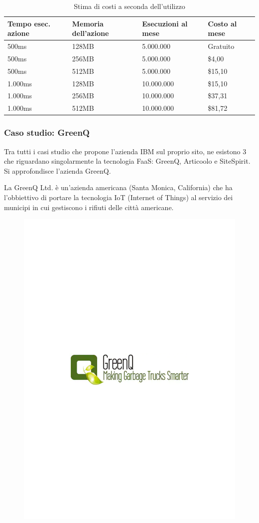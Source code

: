 \documentclass[a4paper]{article}
\begin{document}
	\begin{table}[!htp]
		\centering
		\begin{tabular}{@{} l l l l @{}}
			\toprule
			Tempo esec. azione & Memoria dell'azione & Esecuzioni al mese & Costo al mese \\
			\midrule
			500ms	& 128MB & 5.000.000		& Gratuito \\
			500ms	& 256MB & 5.000.000		& \$4,00 \\
			500ms	& 512MB & 5.000.000		& \$15,10 \\
			1.000ms	& 128MB & 10.000.000	& \$15,10 \\
			1.000ms	& 256MB & 10.000.000	& \$37,31 \\
			1.000ms	& 512MB & 10.000.000	& \$81,72 \\
			\bottomrule
		\end{tabular}
		\caption{Stima di costi a seconda dell'utilizzo}
	\end{table}
	
	\subsubsection{Caso studio: GreenQ}
	
	Tra tutti i casi studio che propone l'azienda IBM sul proprio sito, ne esistono 3 che riguardano singolarmente la tecnologia FaaS: GreenQ, Articoolo e SiteSpirit. Si approfondisce l'azienda GreenQ.\newline
	
	\noindent
	La GreenQ Ltd. è un'azienda americana (Santa Monica, California) che ha l'obbiettivo di portare la tecnologia IoT (Internet of Things) al servizio dei municipi in cui gestiscono i rifiuti delle città americane.
	
	\begin{figure}[!htp]
		\centering
		\includegraphics[width=.5\textwidth]{img/GreenQ-logo.pdf}
	\end{figure}
	
\end{document}

